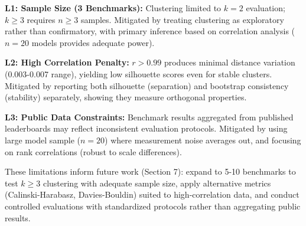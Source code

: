\textbf{L1: Sample Size (3 Benchmarks):} Clustering limited to $k=2$ evaluation; $k \geq 3$ requires $n \geq 3$ samples. Mitigated by treating clustering as exploratory rather than confirmatory, with primary inference based on correlation analysis ($n=20$ models provides adequate power).

\textbf{L2: High Correlation Penalty:} $r > 0.99$ produces minimal distance variation (0.003-0.007 range), yielding low silhouette scores even for stable clusters. Mitigated by reporting both silhouette (separation) and bootstrap consistency (stability) separately, showing they measure orthogonal properties.

\textbf{L3: Public Data Constraints:} Benchmark results aggregated from published leaderboards may reflect inconsistent evaluation protocols. Mitigated by using large model sample ($n=20$) where measurement noise averages out, and focusing on rank correlations (robust to scale differences).

These limitations inform future work (Section 7): expand to 5-10 benchmarks to test $k \geq 3$ clustering with adequate sample size, apply alternative metrics (Calinski-Harabasz, Davies-Bouldin) suited to high-correlation data, and conduct controlled evaluations with standardized protocols rather than aggregating public results.
